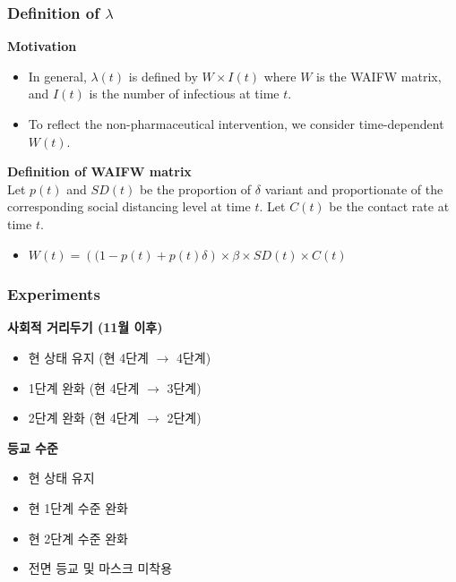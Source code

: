 \documentclass[aspectratio=169, 9pt, xcolor=dvipsnames]{beamer}
\begin{document}
	\begin{frame}\frametitle{Definition of $\lambda$}
		\textbf{Motivation}
	    \begin{itemize}
	    	\item In general, $\lambda(t)$ is defined by $W \times I(t)$ where $W$ is the WAIFW matrix, and $I(t)$ is the number of infectious at time $t$.
	    	\item To reflect the non-pharmaceutical intervention, we consider time-dependent $W(t)$.
	    \end{itemize}
	    \vspace{0.5cm}
	    \textbf{Definition of WAIFW matrix} \\
	    Let $p(t)$ and $SD(t)$ be the proportion of $\delta$ variant and proportionate of the corresponding social distancing level at time $t$. Let $C(t)$ be the contact rate at time $t$.
	    \begin{itemize}
	    	\item $W(t) = \left((1 - p(t) + p(t) \delta\right) \times \beta \times SD(t) \times C(t)$
	    \end{itemize}
	\end{frame}

	\begin{frame}\frametitle{Experiments}
		\textbf{사회적 거리두기 (11월 이후)}
	    \begin{itemize}
	    	\item 현 상태 유지 (현 4단계 $\rightarrow$ 4단계)
	    	\item 1단계 완화 (현 4단계 $\rightarrow$ 3단계)
	    	\item 2단계 완화 (현 4단계 $\rightarrow$ 2단계)
	    \end{itemize}
	    \vspace{0.5cm}
	    \textbf{등교 수준}
	    \begin{itemize}
	    	\item 현 상태 유지
	    	\item 현 1단계 수준 완화
	    	\item 현 2단계 수준 완화
	    	\item 전면 등교 및 마스크 미착용
	    \end{itemize}
	\end{frame}
\end{document}
